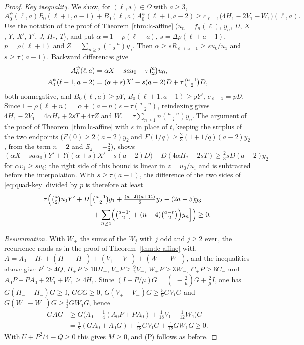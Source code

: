 \begin{proof}
\emph{Key inequality.} We show, for $(\ell,a)\in\Omega$ with $a\geq3$,
\begin{equation}\label{eq:quad-key}
A^\psi_0(\ell,a)B_0(\ell+1,a-1)+B_0(\ell,a)A^\psi_0(\ell+1,a-2)\geq c_{\ell+1}\bigl(4H_1-2V_1-W_1\bigr)(\ell,a).
\end{equation}
Use the notation of the proof of Theorem~\ref{thm:lc-affine} ($u_n=f_n(\ell)$, $y_n$, $D$, $X$, $Y$, $X'$, $Y'$, $J$, $H_*$, $T$), and put $\alpha=1-\rho(\ell+a)$, $s=\Delta\rho(\ell+a-1)$, $p=\rho(\ell+1)$ and $Z=\sum_{n\geq2}\binom{a-n}2y_n$. Then $\alpha\geq sR_{\ell+a-1}\geq su_0/u_1$ and $s\geq\tau(a-1)$. Backward differences give
\[
\begin{aligned}
A^\psi_0(\ell,a)&=\alpha X-sau_0+\tau\tbinom a2u_0,\\
A^\psi_0(\ell+1,a-2)&=(\alpha+s)X'-s(a-2)D+\tau\tbinom{a-1}2D,
\end{aligned}
\]
both nonnegative, and $B_0(\ell,a)\geq pY$, $B_0(\ell+1,a-1)\geq pY'$, $c_{\ell+1}=pD$. Since $1-\rho(\ell+n)=\alpha+(a-n)s-\tau\binom{a-n}2$, reindexing gives $4H_1-2V_1=4\alpha H_*+2sT+4\tau Z$ and $W_1=\tau\sum_{n\geq1}n\binom{a-n}2y_n$. The argument of the proof of Theorem~\ref{thm:lc-affine} with $s$ in place of $t$, keeping the surplus of the two endpoints ($F(0)\geq2(a-2)y_2$ and $F(1/q)\geq\frac23(1+1/q)(a-2)y_2$, from the term $n=2$ and $E_2=-\frac23$), shows
\[
(\alpha X-sau_0)Y'+Y\bigl((\alpha+s)X'-s(a-2)D\bigr)-D(4\alpha H_*+2sT)\geq\tfrac23sD(a-2)y_2
\]
for $\alpha u_1\geq su_0$; the right side of this bound is linear in $z=u_0/u_1$ and is subtracted before the interpolation. With $s\geq\tau(a-1)$, the difference of the two sides of \eqref{eq:quad-key} divided by $p$ is therefore at least
\[
\begin{aligned}
\tau\Bigl(\tbinom a2u_0Y'+D\Bigl[&\tbinom{a-1}2y_1+\tfrac{(a-2)(a+11)}6y_2+(2a-5)y_3\\
&+\sum_{n\geq4}\Bigl(\tbinom{a-1}2+(n-4)\tbinom{a-n}2\Bigr)y_n\Bigr]\Bigr)\geq0.
\end{aligned}
\]

\emph{Resummation.} With $W_\pm$ the sums of the $W_j$ with $j$ odd and $j\geq2$ even, the recurrence reads as in the proof of Theorem~\ref{thm:lc-affine} with $A=A_0-H_1+(H_+-H_-)+(V_+-V_-)+(W_+-W_-)$, and the inequalities above give $P^2\geq4Q$, $H_+P\geq10H_-$, $V_+P\geq\frac92V_-$, $W_+P\geq3W_-$, $C_+P\geq6C_-$ and $A_0P+PA_0+2V_1+W_1\geq4H_1$. Since $(I-P/\mu)G=(1-\frac2\mu)G+\frac2\mu I$, one has $G(H_+-H_-)G\geq0$, $GCG\geq0$, $G(V_+-V_-)G\geq\frac59GV_1G$ and $G(W_+-W_-)G\geq\frac13GW_1G$, hence
\[
\begin{aligned}
GAG&\geq G\bigl(A_0-\tfrac14(A_0P+PA_0)+\tfrac1{18}V_1+\tfrac1{12}W_1\bigr)G\\
&=\tfrac12(GA_0+A_0G)+\tfrac1{18}GV_1G+\tfrac1{12}GW_1G\geq0.
\end{aligned}
\]
With $U+P^2/4-Q\geq0$ this gives $M\geq0$, and (P) follows as before.
\end{proof}

